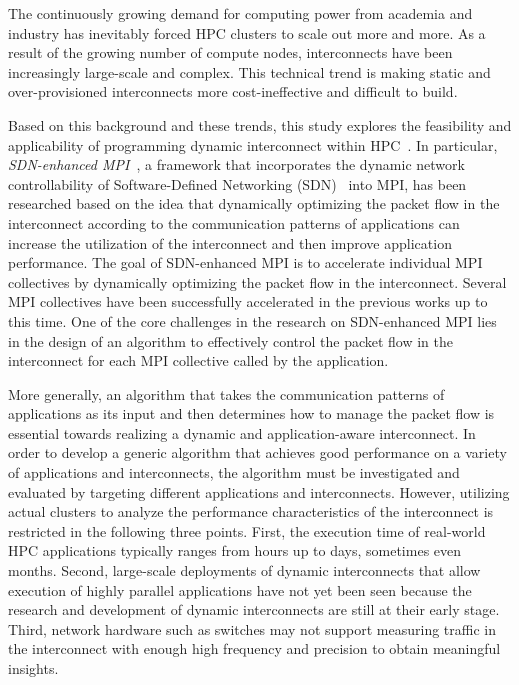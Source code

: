 The continuously growing demand for computing power from academia and
industry has inevitably forced HPC clusters to scale out more and more.
As a result of the growing number of compute nodes, interconnects
have been increasingly large-scale and complex. This technical trend is making
static and over-provisioned interconnects more cost-ineffective and
difficult to build.

Based on this background and these trends, this study explores the feasibility
and applicability of programming dynamic interconnect within
HPC~\autocite{Date2016}. In particular, \emph{SDN-enhanced
MPI}~\autocite{Takahashi2014,Dashdavaa2013}, a framework that incorporates
the dynamic network controllability of Software-Defined Networking
(SDN)~\autocite{sdn} into MPI, has been researched based on the idea that
dynamically optimizing the packet flow in the interconnect according to the
communication patterns of applications can increase the utilization of the
interconnect and then improve application performance. The goal of
SDN-enhanced MPI is to accelerate individual MPI collectives by dynamically
optimizing the packet flow in the interconnect. Several MPI collectives have
been successfully accelerated in the previous works up to this time. One of
the core challenges in the research on SDN-enhanced MPI lies in the design of
an algorithm to effectively control the packet flow in the interconnect for
each MPI collective called by the application.

More generally, an algorithm that takes the communication patterns of
applications as its input and then determines how to manage the packet flow
is essential towards realizing a dynamic and application-aware interconnect.
In order to develop a generic algorithm that achieves good performance on a
variety of applications and interconnects, the algorithm must be investigated
and evaluated by targeting different applications and interconnects. However,
utilizing actual clusters to analyze the performance characteristics of the
interconnect is restricted in the following three points. First, the execution
time of real-world HPC applications typically ranges from hours up to days,
sometimes even months. Second, large-scale deployments of dynamic
interconnects that allow execution of highly parallel applications have not
yet been seen because the research and development of dynamic interconnects
are still at their early stage. Third, network hardware such as switches may
not support measuring traffic in the interconnect with enough high frequency
and precision to obtain meaningful insights.


